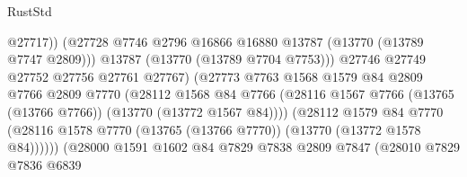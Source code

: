 \begin{lexlean}{RustStd}
\begin{coremodule}
                                            @27717))
                                        (@27728
                                          @7746
                                          @2796
                                          @16866
                                          @16880
                                          @13787
                                          (@13770 (@13789 @7747 @2809)))
                                        @13787
                                        (@13770 (@13789 @7704 @7753)))
                                      @27746
                                      @27749
                                      @27752
                                      @27756
                                      @27761
                                      @27767)
                                    (@27773
                                      @7763
                                      @1568
                                      @1579
                                      @84
                                      @2809
                                      @7766
                                      @2809
                                      @7770
                                      (@28112
                                        @1568
                                        @84
                                        @7766
                                        (@28116
                                          @1567
                                          @7766
                                          (@13765 (@13766 @7766))
                                          (@13770 (@13772 @1567 @84))))
                                      (@28112
                                        @1579
                                        @84
                                        @7770
                                        (@28116
                                          @1578
                                          @7770
                                          (@13765 (@13766 @7770))
                                          (@13770 (@13772 @1578 @84))))))
                                  (@28000
                                    @1591
                                    @1602
                                    @84
                                    @7829
                                    @7838
                                    @2809
                                    @7847
                                    (@28010
                                      @7829
                                      @7836
                                      @6839

\end{coremodule}
\end{lexlean}
